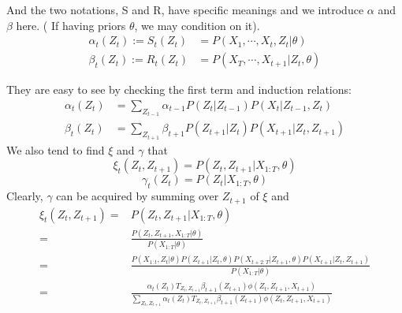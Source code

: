\documentclass{article}
\begin{document}
And the two notations, S and R, have specific meanings and we introduce $\alpha$ and $\beta$ here. ( If having priors $\theta$, we may condition on it).
$$
\begin{aligned}
\alpha_{t}(Z_t) := S_{t}(Z_t)&=P(X_1,\cdots, X_t,Z_t|\theta )\\
\beta_{t}(Z_t) := R_t (Z_t)&=P(X_{T},\cdots, X_{t+1}| Z_{t}, \theta)
\end{aligned}
$$

They are easy to see by checking the first term and induction relations:
$$
\begin{aligned}
\alpha_{t}(Z_t)&= \sum_{Z_{t-1}} \alpha_{t-1}P(Z_t|Z_{t-1})P(X_t|Z_{t-1}, Z_t)\\
\beta_t (Z_t)&=\sum_{Z_{t+1}} \beta_{t+1} P(Z_{t+1}|Z_t) P(X_{t+1}|Z_{t}, Z_{t+1})
\end{aligned}
$$
We also tend to find $\xi$ and $\gamma$ that
$$
\xi_t(Z_t, Z_{t+1})=P(Z_t, Z_{t+1}| X_{1:T}, \theta)
$$
$$
\gamma_t(Z_t)= P(Z_t | X_{1:T}, \theta)
$$
Clearly, $\gamma$ can be acquired by summing over $Z_{t+1}$ of $\xi$ and 
$$
\begin{aligned}
\xi_t(Z_t, Z_{t+1})=& P(Z_t, Z_{t+1}| X_{1:T}, \theta)\\
= & \frac{P(Z_t, Z_{t+1}, X_{1:T}|\theta )}{P(X_{1:T}|\theta )}\\
=& \frac{P(X_{1:t}, Z_t|\theta)P(Z_{t+1}|Z_t, \theta)P(X_{t+2:T}|Z_{t+1},\theta) P(X_{t+1}| Z_t, Z_{t+1})}{P(X_{1:T}|\theta )}\\
=&\frac{\alpha_t(Z_t) T_{Z_t, Z_{t+1}} \beta_{t+1}(Z_{t+1}) \phi(Z_t, Z_{t+1}, X_{t+1})}{\sum_{Z_t, Z_{t+1}} \alpha_t(Z_t) T_{Z_t, Z_{t+1}} \beta_{t+1}(Z_{t+1}) \phi(Z_t, Z_{t+1}, X_{t+1})}
\end{aligned}
$$
\end{document}
